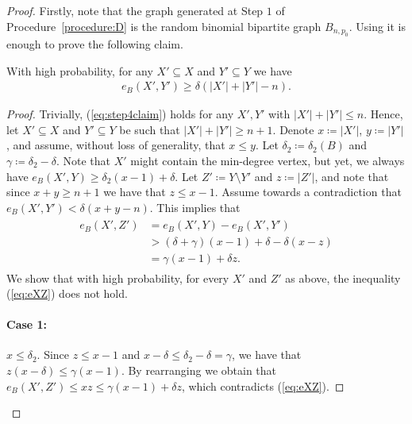 \documentclass{article}
\begin{document}
	\begin{proof}
		Firstly, note that the graph generated at Step $1$ of Procedure~\ref{procedure:D} is the random binomial bipartite graph $B_{n,p_0}$.
		Using  it is enough to prove the following claim.
		\begin{claim}
			\label{cl:step4lemma}
			With high probability, for any $X' \subseteq X$ and $Y' \subseteq Y$ we have
			\begin{align}
			\label{eq:step4claim}
			e_{B}\left(X', Y' \right) \ge \delta\left(|X'| + |Y'| - n \right).
			\end{align}
		\end{claim}
		
		\begin{proof}
			Trivially, (\ref{eq:step4claim}) holds for any $X', Y'$ with $|X'| + |Y'| \le n$.
			Hence, let $X' \subseteq X$ and $Y' \subseteq Y$ be such that $|X'| + |Y'| \ge n+1$.
			Denote $x\coloneqq |X'|$, $y\coloneqq |Y'|$, and assume, without loss of generality, that $x \le y$.
			Let $\delta_2 \coloneqq \delta_2(B)$ and $\gamma \coloneqq \delta_2 - \delta$.
			Note that $X'$ might contain the min-degree vertex, but yet, we always have $e_B(X', Y) \ge \delta_2(x-1) + \delta$.
			Let $Z' \coloneqq Y \setminus Y'$ and $z \coloneqq |Z'|$, and note that since $x+y\geq n+1$ we have that $z \le x-1$. Assume towards a contradiction that $e_B(X',Y')< \delta (x+y-n)$. This implies that
			\begin{align}
			\begin{split}
			\label{eq:eXZ}
			e_B(X', Z') &= e_B(X', Y) - e_B(X', Y') \\
			&> (\delta+\gamma)(x-1) + \delta - \delta(x-z) \\
			&= \gamma(x-1) + \delta z.
			\end{split}
			\end{align}
			We show that with high probability, for every $X'$ and $Z'$ as above, the inequality (\ref{eq:eXZ}) does not hold.
			
			\paragraph*{Case 1:} $x \leq \delta_2$. Since $z\leq x-1$ and $x-\delta\leq \delta_2-\delta=\gamma$, we have that 
			$z(x-\delta)\leq \gamma (x-1)$.
			By rearranging we obtain that
			$e_B(X', Z') \leq xz\leq \gamma(x-1) + \delta z$, which contradicts (\ref{eq:eXZ}).
			
			

\end{proof}
\end{proof}
\end{document}

